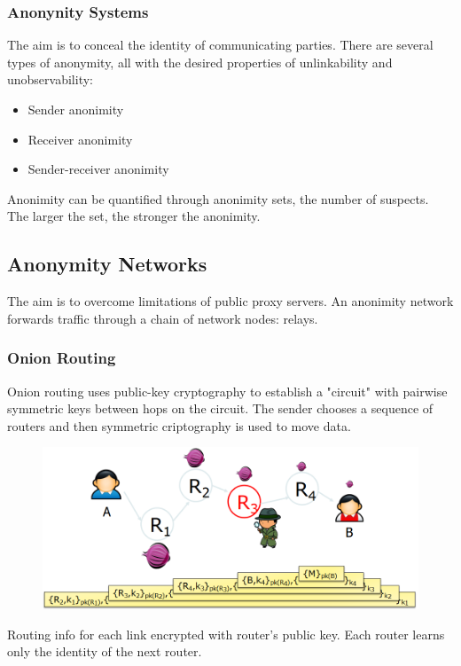 \documentclass[10pt,a4paper]{report}
\begin{document}
\subsubsection{Anonynity Systems}
The aim is to conceal the identity of communicating parties. There are several types of anonymity, all with the desired properties of unlinkability and unobservability:
\begin{itemize}
\item Sender anonimity
\item Receiver anonimity
\item Sender-receiver anonimity
\end{itemize}
Anonimity can be quantified through anonimity sets, the number of suspects. The larger the set, the stronger the anonimity.
\subsection{Anonymity Networks}
The aim is to overcome limitations of public proxy servers. An anonimity network forwards traffic through a chain of network nodes: relays.
\subsubsection{Onion Routing}
Onion routing uses public-key cryptography to establish a "circuit" with pairwise symmetric keys between hops on the circuit. The sender chooses a sequence of routers and then symmetric criptography is used to move data.
\begin{figure}[H]
\centering
\includegraphics[scale=0.5]{28.png}
\end{figure}
Routing info for each link encrypted with router’s public key. Each router learns only the identity of the next router.
\end{document}
